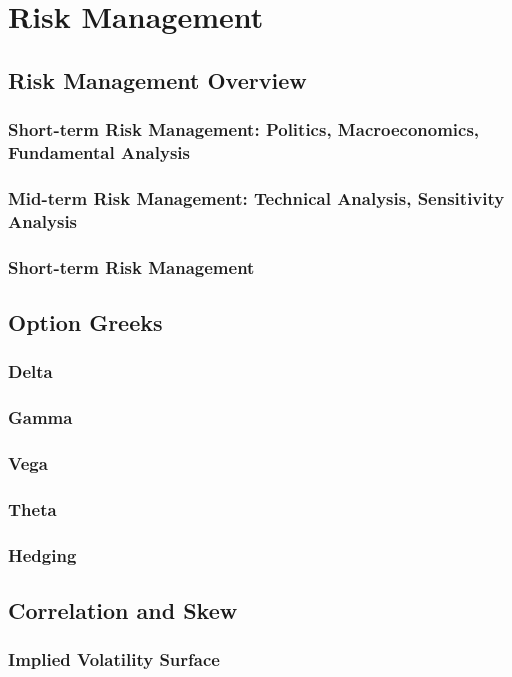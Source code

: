 \documentclass{book}
\begin{document}
\chapter{Risk Management}
\section{Risk Management Overview}
\subsection{Short-term Risk Management: Politics, Macroeconomics, Fundamental Analysis}
\subsection{Mid-term Risk Management: Technical Analysis, Sensitivity Analysis}
\subsection{Short-term Risk Management}

\section{Option Greeks}
\subsection{Delta}
\subsection{Gamma}
\subsection{Vega}
\subsection{Theta}
\subsection{Hedging}

\section{Correlation and Skew}
\subsection{Implied Volatility Surface}
\end{document}
